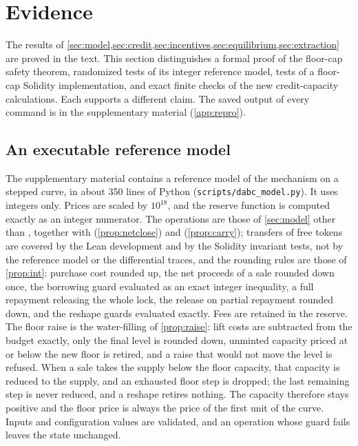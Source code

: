 \section{Evidence}\label{sec:evidence}

The results of \cref{sec:model,sec:credit,sec:incentives,sec:equilibrium,sec:extraction} are proved in the text. This section distinguishes a formal proof of the floor-cap safety theorem, randomized tests of its integer reference model, tests of a floor-cap Solidity implementation, and exact finite checks of the new credit-capacity calculations. Each supports a different claim. The saved output of every command is in the supplementary material (\cref{app:repro}).

\subsection{An executable reference model}

The supplementary material contains a reference model of the mechanism on a stepped curve, in about 350 lines of Python (\texttt{scripts/dabc\_model.py}). It uses integers only. Prices are scaled by $10^{18}$, and the reserve function is computed exactly as an integer numerator. The operations are those of \cref{sec:model} other than , together with  (\cref{prop:netclose}) and  (\cref{prop:carry}); transfers of free tokens are covered by the Lean development and by the Solidity invariant tests, not by the reference model or the differential traces, and the rounding rules are those of \cref{prop:int}: purchase cost rounded up, the net proceeds of a sale rounded down once, the borrowing guard evaluated as an exact integer inequality, a full repayment releasing the whole lock, the release on partial repayment rounded down, and the reshape guards evaluated exactly. Fees are retained in the reserve. The floor raise is the water-filling of \cref{prop:raise}: lift costs are subtracted from the budget exactly, only the final level is rounded down, unminted capacity priced at or below the new floor is retired, and a raise that would not move the level is refused. When a sale takes the supply below the floor capacity, that capacity is reduced to the supply, and an exhausted floor step is dropped; the last remaining step is never reduced, and a reshape retires nothing. The capacity therefore stays positive and the floor price is always the price of the first unit of the curve. Inputs and configuration values are validated, and an operation whose guard fails leaves the state unchanged.

